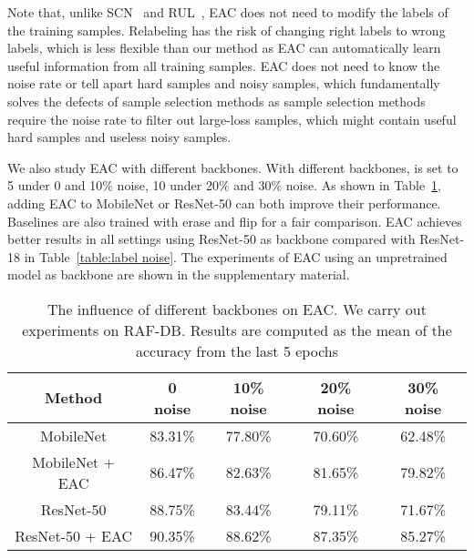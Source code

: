 \documentclass[runningheads]{llncs}
\begin{document}
Note that, unlike SCN~\cite{wang2020suppressing} and RUL~\cite{zhang2021relative}, EAC does not need to modify the labels of the training samples. Relabeling has the risk of changing right labels to wrong labels, which is less flexible than our method as EAC can automatically learn useful information from all training samples. EAC does not need to know the noise rate or tell apart hard samples and noisy samples, which fundamentally solves the defects of sample selection methods as sample selection methods require the noise rate to filter out large-loss samples, which might contain useful hard samples and useless noisy samples.

We also study EAC with different backbones. With different backbones,  is set to 5 under 0 and 10\% noise, 10 under 20\% and 30\% noise. As shown in Table~\ref{table:backbones}, adding EAC to MobileNet or ResNet-50 can both improve their performance. Baselines are also trained with erase and flip for a fair comparison. EAC achieves better results in all settings using ResNet-50 as backbone compared with ResNet-18 in Table~\ref{table:label noise}. The experiments of EAC using an unpretrained model as backbone are shown in the supplementary material.

\begin{table}[!t]
\setlength{\tabcolsep}{8pt}
\begin{center}
\caption{The influence of different backbones on EAC. We carry out experiments on RAF-DB. Results are computed as the mean of the accuracy from the last 5 epochs}
\label{table:backbones}
\begin{tabular}{ccccc}
\hline
Method             & 0 noise & 10\% noise & 20\% noise & 30\% noise \\ \hline
MobileNet  & 83.31\% & 77.80\%    & 70.60\%    & 62.48\%    \\
MobileNet + EAC & \textcolor[rgb]{1,0,0}{86.47\%} & \textcolor[rgb]{1,0,0}{82.63\%}    & \textcolor[rgb]{1,0,0}{81.65\%}    & \textcolor[rgb]{1,0,0}{79.82\%}    \\
\hline
ResNet-50  & 88.75\% & 83.44\%    & 79.11\%    & 71.67\%    \\
ResNet-50 + EAC    & \textcolor[rgb]{1,0,0}{90.35\%} & \textcolor[rgb]{1,0,0}{88.62\%}    & \textcolor[rgb]{1,0,0}{87.35\%}    & \textcolor[rgb]{1,0,0}{85.27\%}    \\

\hline
\end{tabular}
\end{center}
\end{table}
\end{document}
